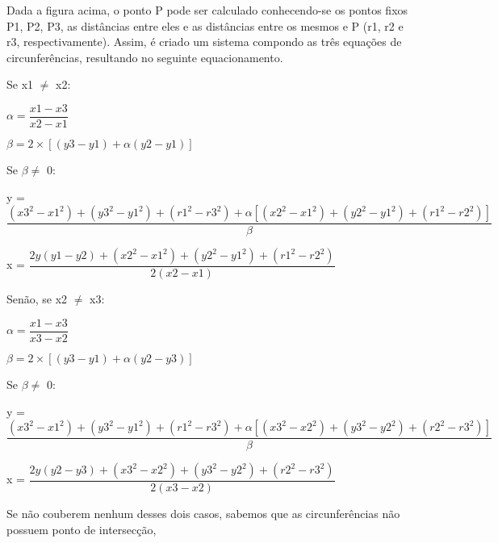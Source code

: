 Dada a figura acima, o ponto P pode ser calculado conhecendo-se os pontos fixos P1, P2, P3, as distâncias entre eles e as distâncias entre os mesmos e P (r1, r2 e r3, respectivamente). Assim, é criado um sistema compondo as três equações de circunferências, resultando no seguinte equacionamento.

Se x1 $\neq$ x2:

\quad $\alpha = \dfrac{x1 - x3}{x2 - x1}$

\quad $\beta = 2 \times [(y3 - y1) + \alpha(y2 - y1)]$

\quad Se $\beta \neq$ 0:

\quad \quad y = $\dfrac{(x3^2 - x1^2) + (y3^2 - y1^2) + (r1^2 - r3^2) + \alpha[(x2^2 - x1^2) + (y2^2 - y1^2) + (r1^2 - r2^2)]}{\beta}$

\quad \quad x = $\dfrac{2y(y1 - y2) + (x2^2 - x1^2) + (y2^2 - y1^2) + (r1^2 - r2^2)}{2(x2 - x1)}$

Senão, se x2 $\neq$ x3:

\quad $\alpha = \dfrac{x1 - x3}{x3 - x2}$

\quad $\beta = 2 \times [(y3 - y1) + \alpha(y2 - y3)]$

\quad Se $\beta \neq$ 0:

\quad \quad y = $\dfrac{(x3^2 - x1^2) + (y3^2 - y1^2) + (r1^2 - r3^2) + \alpha[(x3^2 - x2^2) + (y3^2 - y2^2) + (r2^2 - r3^2)]}{\beta}$

\quad \quad x = $\dfrac{2y(y2 - y3) + (x3^2 - x2^2) + (y3^2 - y2^2) + (r2^2 - r3^2)}{2(x3 - x2)}$

Se não couberem nenhum desses dois casos, sabemos que as circunferências não possuem ponto de intersecção,